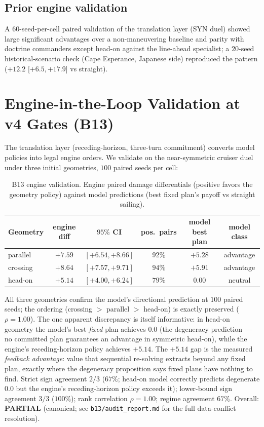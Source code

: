 \documentclass[12pt,a4paper]{article}
\begin{document}
\subsection{Prior engine validation}
A $60$-seed-per-cell paired validation of the translation layer (SYN
duel) showed large significant advantages over a non-maneuvering baseline
and parity with doctrine commanders except head-on against the
line-ahead specialist; a $20$-seed historical-scenario check (Cape
Esperance, Japanese side) reproduced the pattern ($+12.2$ [$+6.5,+17.9$]
vs straight).

\section{Engine-in-the-Loop Validation at v4 Gates (B13)}\label{sec:validation}

The translation layer (receding-horizon, three-turn commitment) converts
model policies into legal engine orders.  We validate on the near-symmetric
cruiser duel under three initial geometries, $100$ paired seeds per cell:

\begin{table}[!htb]
\centering\small
\caption{B13 engine validation.  Engine paired damage differentials
(positive favors the geometry policy) against model predictions (best
fixed plan's payoff vs straight sailing).}
\label{tab:b13}
\begin{tabular}{lccccc}
\toprule
Geometry & engine diff & $95\%$ CI & pos.\ pairs & model best plan & model class \\
\midrule
parallel & $+7.59$ & $[+6.54,+8.66]$ & $92\%$ & $+5.28$ & advantage \\
crossing & $+8.64$ & $[+7.57,+9.71]$ & $94\%$ & $+5.91$ & advantage \\
head-on & $+5.14$ & $[+4.00,+6.24]$ & $79\%$ & $0.00$ & neutral \\
\bottomrule
\end{tabular}
\end{table}

All three geometries confirm the model's directional prediction at
$100$ paired seeds; the ordering (crossing $>$ parallel $>$ head-on) is
exactly preserved ($\rho=1.00$).  The one apparent discrepancy is itself
informative: in head-on geometry the model's best \emph{fixed} plan
achieves $0.0$ (the degeneracy prediction --- no committed plan guarantees
an advantage in symmetric head-on), while the engine's receding-horizon
policy achieves $+5.14$.  The $+5.14$ gap is the measured
\emph{feedback advantage}: value that sequential re-solving extracts
beyond any fixed plan, exactly where the degeneracy proposition says
fixed plans have nothing to find.  Strict sign agreement $2/3$ ($67\%$; head-on model correctly predicts
degenerate $0.0$ but the engine's receding-horizon policy exceeds it);
lower-bound sign agreement $3/3$ ($100\%$); rank correlation $\rho=1.00$;
regime agreement $67\%$.  Overall: \textbf{PARTIAL} (canonical; see
\texttt{b13/audit\_report.md} for the full data-conflict resolution).
\end{document}
